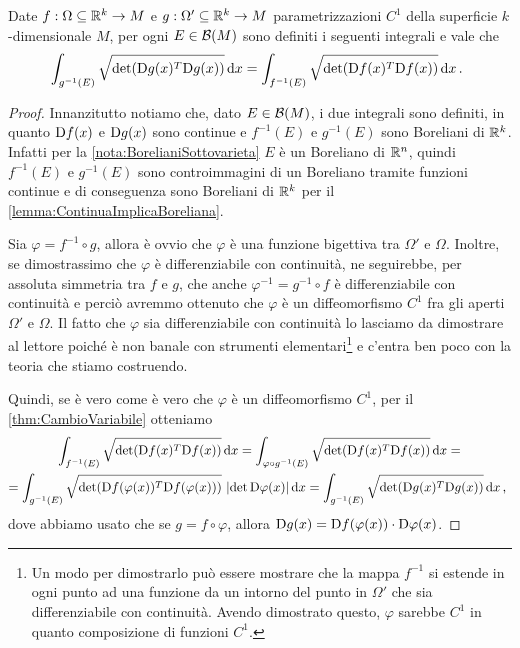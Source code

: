 \begin{lemma}\label{lemma:InvarianzaImmersione}
	Date $f:\Omega\subseteq\mathbb R^k\to M$ e $g:\Omega'\subseteq\mathbb R^k\to M$ parametrizzazioni $C^1$ della superficie $k$-dimensionale $M$, per ogni $E\in\mathcal B(M)$ sono definiti i seguenti integrali e vale che 
	\begin{equation*}
		\int_{g^{-1}(E)}\sqrt{\det(\mathrm D g(x)^T\mathrm D g(x))}\,\mathrm d x=\int_{f^{-1}(E)}\sqrt{\det(\mathrm D f(x)^T\mathrm D f(x))}\,\mathrm d x\, \text{. }
	\end{equation*}
\end{lemma}
\begin{proof}
	Innanzitutto notiamo che, dato $E\in\mathcal B(M)$, i due integrali sono definiti, in quanto $\mathrm D f(x)$ e $\mathrm D g(x)$ sono continue e $f^{-1}(E)$ e $g^{-1}(E)$ sono Boreliani di $\mathbb R^k$. Infatti per la \cref{nota:BorelianiSottovarieta} $E$ è un Boreliano di $\mathbb R^n$, quindi $f^{-1}(E)$ e $g^{-1}(E)$ sono controimmagini di un Boreliano tramite funzioni continue e di conseguenza sono Boreliani di $\mathbb R^k$ per il \cref{lemma:ContinuaImplicaBoreliana}.

	Sia $\varphi=f^{-1}\circ g$, allora è ovvio che $\varphi$ è una funzione bigettiva tra $\Omega'$ e $\Omega$. Inoltre, se dimostrassimo che $\varphi$ è differenziabile con continuità,  ne seguirebbe, per assoluta simmetria tra $f$ e $g$, che anche $\varphi^{-1}=g^{-1}\circ f$ è differenziabile con continuità e perciò avremmo ottenuto che $\varphi$ è un diffeomorfismo $C^1$ fra gli aperti $\Omega'$ e $\Omega$. Il fatto che $\varphi$ sia differenziabile con continuità lo lasciamo da dimostrare al lettore poiché è non banale con strumenti elementari\footnote{Un modo per dimostrarlo può essere mostrare che la mappa $f^{-1}$ si estende in ogni punto ad una funzione da un intorno del punto in $\Omega'$ che sia differenziabile con continuità. Avendo dimostrato questo, $\varphi$ sarebbe $C^1$ in quanto composizione di funzioni $C^1$.} e c'entra ben poco con la teoria che stiamo costruendo.
	
	Quindi, se è vero come è vero che $\varphi$ è un diffeomorfismo $C^1$, per il \cref{thm:CambioVariabile} otteniamo
	\begin{multline*}
		\int_{f^{-1}(E)}\sqrt{\det(\mathrm D f(x)^T\mathrm D f(x))}\,\mathrm d x=\int_{\varphi\circ g^{-1}(E)}\sqrt{\det(\mathrm D f(x)^T\mathrm D f(x))}\,\mathrm d x=\\
		=\int_{g^{-1}(E)}\sqrt{\det(\mathrm D f(\varphi(x))^T\mathrm D f(\varphi(x)))}\ \lvert\det \mathrm D \varphi(x)\rvert\,\mathrm d x=\int_{g^{-1}(E)}\sqrt{\det(\mathrm D g(x)^T\mathrm D g(x))}\,\mathrm d x\, \text{, }
	\end{multline*}
	dove abbiamo usato che se $g=f\circ \varphi$, allora $\mathrm D g(x)=\mathrm D f(\varphi(x))\cdot \mathrm D\varphi(x)$.
\end{proof}

